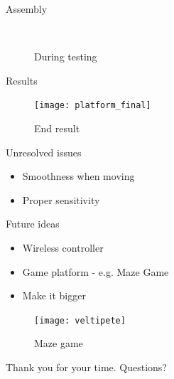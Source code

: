 \documentclass{rubeamer}
\begin{document}
\begin{frame}{Assembly}
	\begin{figure}
		\centering
		~
		\caption*{During testing}
	\end{figure}
\end{frame}

\begin{frame}{Results}
	\begin{figure}
		\centering
		\texttt{[image: platform\_final]}
		\caption*{End result}
	\end{figure}
\end{frame}

\begin{frame}{Unresolved issues}
	\begin{itemize}
		\item Smoothness when moving
		\item Proper sensitivity
	\end{itemize}
\end{frame}

\begin{frame}{Future ideas}
	\vspace{3em}
	\begin{itemize}
		\item Wireless controller
		\item Game platform - e.g. Maze Game
		\item Make it bigger
	\end{itemize}
	
	\begin{figure}
		\vspace{-3em}
		\centering
		\texttt{[image: veltipete]}
		\caption*{Maze game~\cite{veltipete}}
	\end{figure}
\end{frame}
\begin{frame}
	\centering
	Thank you for your time.
	Questions?\\
\end{frame}

\bibframe
\end{document}
